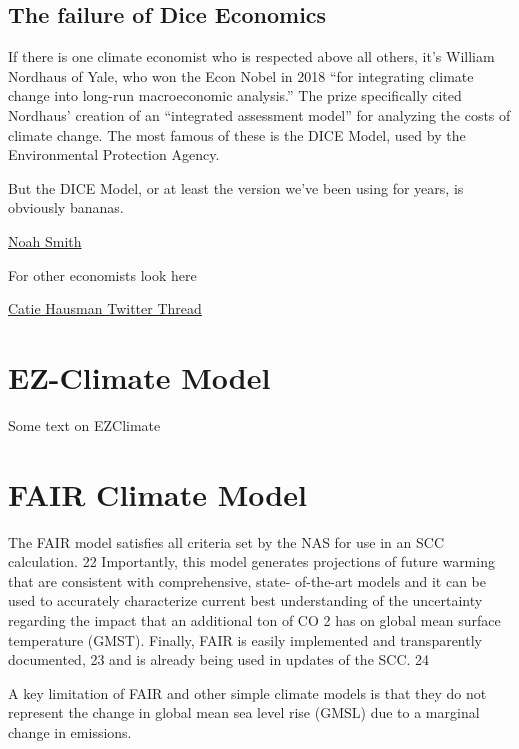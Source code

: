 \documentclass[
]{book}
\begin{document}
\hypertarget{the-failure-of-dice-economics}{%
\subsection{The failure of Dice Economics}\label{the-failure-of-dice-economics}}

If there is one climate economist who is respected above all others, it's William Nordhaus of Yale, who won the Econ Nobel in 2018 ``for integrating climate change into long-run macroeconomic analysis.'' The prize specifically cited Nordhaus' creation of an ``integrated assessment model'' for analyzing the costs of climate change. The most famous of these is the DICE Model, used by the Environmental Protection Agency.

But the DICE Model, or at least the version we've been using for years, is obviously bananas.

\href{https://noahpinion.substack.com/p/why-has-climate-economics-failed}{Noah Smith}

For other economists look here

\href{https://twitter.com/CatieHausman/status/1381999336423362568}{Catie Hausman Twitter Thread}

\hypertarget{ez-climate-model}{%
\section{EZ-Climate Model}\label{ez-climate-model}}

Some text on EZClimate

\hypertarget{fair-climate-model}{%
\section{FAIR Climate Model}\label{fair-climate-model}}

The FAIR model satisfies all
criteria set by the NAS for use in an SCC calculation. 22 Importantly, this model
generates projections of future warming that are consistent with comprehensive, state-
of-the-art models and it can be used to accurately characterize current best
understanding of the uncertainty regarding the impact that an additional ton of CO 2
has on global mean surface temperature (GMST). Finally, FAIR is easily implemented
and transparently documented, 23 and is already being used in updates of the SCC. 24

A key limitation of FAIR and other simple climate models is that they do not represent
the change in global mean sea level rise (GMSL) due to a marginal change in emissions.
\end{document}
